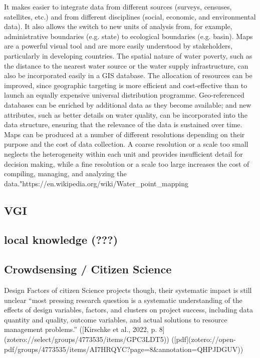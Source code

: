 {It makes easier to integrate data from different sources (surveys, censuses, satellites, etc.) and from different disciplines (social, economic, and environmental data). It also allows the switch to new units of analysis from, for example, administrative boundaries (e.g. state) to ecological boundaries (e.g. basin).
Maps are a powerful visual tool and are more easily understood by stakeholders, particularly in developing countries.
The spatial nature of water poverty, such as the distance to the nearest water source or the water supply infrastructure, can also be incorporated easily in a GIS database.
The allocation of resources can be improved, since geographic targeting is more efficient and cost-effective than to launch an equally expensive universal distribution programme.
Geo-referenced databases can be enriched by additional data as they become available; and new attributes, such as better details on water quality, can be incorporated into the data structure, ensuring that the relevance of the data is sustained over time.
Maps can be produced at a number of different resolutions depending on their purpose and the cost of data collection. A coarse resolution or a scale too small neglects the heterogeneity within each unit and provides insufficient detail for decision making, while a fine resolution or a scale too large increases the cost of compiling, managing, and analyzing the data."https://en.wikipedia.org/wiki/Water_point_mapping


\subsection{VGI}



\subsection{local knowledge (???)}

\subsection{Crowdsensing / Citizen Science}
Design Factors of citizen Science projects
though, their systematic impact is still unclear “most pressing research question is a systematic understanding of the effects of design variables, factors, and clusters on project success, including data quantity and quality, outcome variables, and actual solutions to resource management problems.” ([Kirschke et al., 2022, p. 8](zotero://select/groups/4773535/items/GPC3LDT5)) ([pdf](zotero://open-pdf/groups/4773535/items/AI7HRQYC?page=8&annotation=QHPJDGUV))

}
